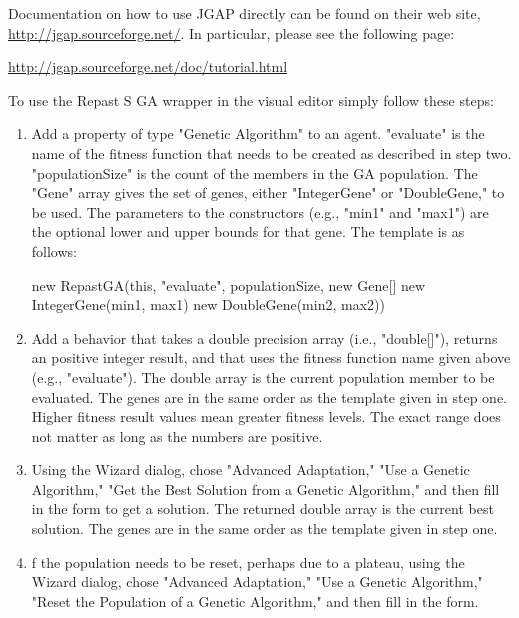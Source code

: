 \documentclass[11pt]{article}
\begin{document}
Documentation on how to use JGAP directly can be found on their web site, \url{http://jgap.sourceforge.net/}. In particular, please see the following page:

\url{http://jgap.sourceforge.net/doc/tutorial.html}

To use the Repast S GA wrapper in the visual editor simply follow these steps:

\begin{enumerate}
\item Add a property of type "Genetic Algorithm" to an agent. "evaluate" is the name of the fitness function that needs to be created as described in step two. "populationSize" is the count of the members in the GA population. The "Gene" array gives the set of genes, either "IntegerGene" or "DoubleGene," to be used. The parameters to the constructors (e.g., "min1" and "max1") are the optional lower and upper bounds for that gene. The template is as follows:

new RepastGA(this, "evaluate", populationSize, new Gene[]{ new IntegerGene(min1, max1) new DoubleGene(min2, max2)})

\item Add a behavior that takes a double precision array (i.e., "double[]"), returns an positive integer result, and that uses the fitness function name given above (e.g., "evaluate"). The double array is the current population member to be evaluated. The genes are in the same order as the template given in step one. Higher fitness result values mean greater fitness levels. The exact range does not matter as long as the numbers are positive.

\item Using the Wizard dialog, chose "Advanced Adaptation," "Use a Genetic Algorithm," "Get the Best Solution from a Genetic Algorithm," and then fill in the form to get a solution. The returned double array is the current best solution. The genes are in the same order as the template given in step one.

\item f the population needs to be reset, perhaps due to a plateau, using the Wizard dialog, chose "Advanced Adaptation," "Use a Genetic Algorithm," "Reset the Population of a Genetic Algorithm," and then fill in the form.
\end{enumerate}
\end{document}
